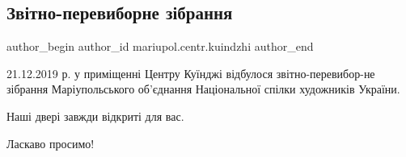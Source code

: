  
 
 
 
 

\subsection{Звітно-перевиборне зібрання}
\label{sec:27_12_2019.fb.mariupol.centr.kuindzhi.2.zvitno_perevyborne_zibrannja}

\ifcmt
 author_begin
   author_id mariupol.centr.kuindzhi
 author_end
\fi

21.12.2019 р. у приміщенні Центру Куїнджі відбулося звітно-перевибор\hyp{}не
зібрання Маріупольського об'єднання Національної спілки художників України.

Наші двері завжди відкриті для вас.

Ласкаво просимо!
